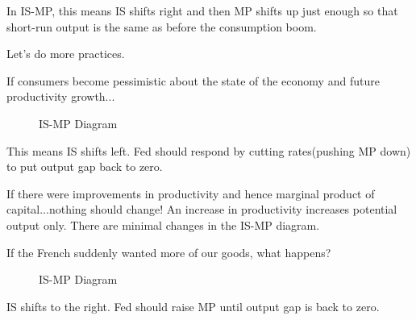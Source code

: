 \documentclass[11pt]{scrartcl}
\newcommand{\og}{\ensuremath{\tilde{Y}}}
\begin{document}
In IS-MP, this means IS shifts right and then MP shifts up just enough so that short-run output is the same as before the consumption boom.

Let's do more practices.

If consumers become pessimistic about the state of the economy and future productivity
growth...

\begin{figure}[H]
\centering
{}
\caption{\color{blue}IS-\color{black}MP Diagram}
\end{figure}

This means IS shifts left. Fed should respond by cutting rates(pushing MP down) to put
output gap back to zero.

If there were improvements in productivity and hence marginal product of capital...nothing should change!  An increase in productivity increases potential output only. There are minimal changes in the IS-MP diagram.

If the French suddenly wanted more of our goods, what happens? 

\begin{figure}[H]
\centering
{}
\caption{\color{blue}IS-\color{black}MP Diagram}
\end{figure}

IS shifts to the right. Fed should raise MP until output gap is back to zero.
\end{document}
